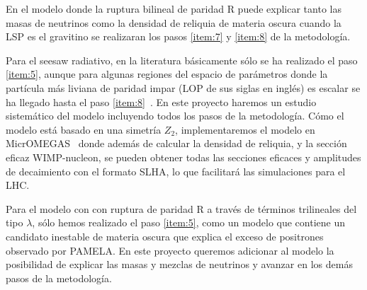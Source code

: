 \begin{proyecto}
  En el modelo donde la ruptura bilineal de paridad R puede explicar
  tanto las masas de neutrinos como la densidad de reliquia de materia
  oscura cuando la LSP es el gravitino se realizaran los pasos
  \ref{item:7} y \ref{item:8} de la metodología.
\end{proyecto}


\begin{evaluador}
  \begin{darkmatter}
  \begin{proyecto}
  Para el seesaw radiativo, en la literatura básicamente sólo se ha
  realizado el paso \ref{item:5}, aunque para algunas regiones del
  espacio de parámetros donde la partícula más liviana de paridad
  impar (LOP de sus siglas en inglés) es escalar se ha llegado hasta
  el paso \ref{item:8}~\cite{Bergman:2007pm}. En este proyecto haremos un
  estudio sistemático del modelo incluyendo todos los pasos de la
  metodología. Cómo el modelo está basado en una simetría $Z_2$,
  implementaremos el modelo en MicrOMEGAS~\cite{Belanger:2010gh} donde
  además de calcular la densidad de reliquia, y la sección eficaz
  WIMP-nucleon, se pueden obtener todas las secciones eficaces y
  amplitudes de decaimiento con el formato SLHA, lo que facilitará las
  simulaciones para el LHC.
\end{proyecto}
\end{darkmatter}
\end{evaluador}



\begin{proyecto}
  Para el modelo con con ruptura de paridad R a través de términos
  trilineales del tipo $\lambda$, sólo hemos realizado el paso
  \ref{item:5}, como un modelo que contiene un candidato inestable de
  materia oscura que explica el exceso de positrones observado por
  PAMELA. En este proyecto queremos adicionar al modelo la posibilidad
  de explicar las masas y mezclas de neutrinos y avanzar en los demás
  pasos de la metodología.
\end{proyecto}

